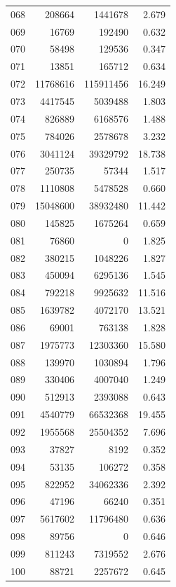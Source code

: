 \documentclass[anonymous,notoc]{gmcm2026}
\begin{document}
\begin{longtable}{lrrr}
068 & 208664 & 1441678 & 2.679 \\
069 & 16769 & 192490 & 0.632 \\
070 & 58498 & 129536 & 0.347 \\
071 & 13851 & 165712 & 0.634 \\
072 & 11768616 & 115911456 & 16.249 \\
073 & 4417545 & 5039488 & 1.803 \\
074 & 826889 & 6168576 & 1.488 \\
075 & 784026 & 2578678 & 3.232 \\
076 & 3041124 & 39329792 & 18.738 \\
077 & 250735 & 57344 & 1.517 \\
078 & 1110808 & 5478528 & 0.660 \\
079 & 15048600 & 38932480 & 11.442 \\
080 & 145825 & 1675264 & 0.659 \\
081 & 76860 & 0 & 1.825 \\
082 & 380215 & 1048226 & 1.827 \\
083 & 450094 & 6295136 & 1.545 \\
084 & 792218 & 9925632 & 11.516 \\
085 & 1639782 & 4072170 & 13.521 \\
086 & 69001 & 763138 & 1.828 \\
087 & 1975773 & 12303360 & 15.580 \\
088 & 139970 & 1030894 & 1.796 \\
089 & 330406 & 4007040 & 1.249 \\
090 & 512913 & 2393088 & 0.643 \\
091 & 4540779 & 66532368 & 19.455 \\
092 & 1955568 & 25504352 & 7.696 \\
093 & 37827 & 8192 & 0.352 \\
094 & 53135 & 106272 & 0.358 \\
095 & 822952 & 34062336 & 2.392 \\
096 & 47196 & 66240 & 0.351 \\
097 & 5617602 & 11796480 & 0.636 \\
098 & 89756 & 0 & 0.646 \\
099 & 811243 & 7319552 & 2.676 \\
100 & 88721 & 2257672 & 0.645 \\
\end{longtable}
\end{document}

